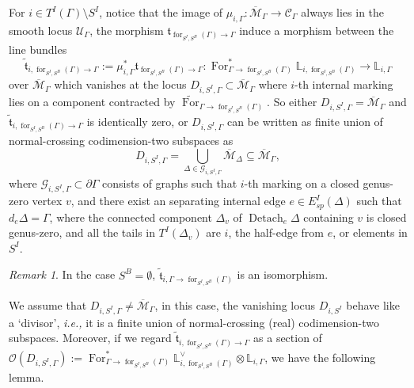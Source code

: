 \documentclass[11pt]{amsart}
\theoremstyle{definition}
\theoremstyle{remark}
\newtheorem{rmk}[dummy]{Remark}
\renewcommand{\for}{\operatorname{for}}
\newcommand{\For}{\operatorname{For}}
\newcommand{\<}{\left<}
\renewcommand{\>}{\right>}
\numberwithin{equation}{section}
\def\Mbar{{\overline{\mathcal M}}}
\begin{document}
For $i\in T^I(\Gamma)\setminus S^I$, notice that the image of $\mu_{i,\Gamma}\colon \Mbar_{\Gamma}\to \mathcal C_\Gamma$ always lies in the smooth locus $\mathcal U_{\Gamma}$, the morphism  $\mathfrak t_{\for_{{S^I,S^B}}(\Gamma)\to \Gamma}$ induce a morphism between the line bundles $$\tilde{\mathfrak t}_{i,\for_{{S^I,S^B}}(\Gamma)\to \Gamma}:=  \mu_{i,\Gamma}^*\mathfrak t_{\for_{{S^I,S^B}}(\Gamma)\to \Gamma}\colon \For_{\Gamma\to \for_{{S^I,S^B}}(\Gamma)}^*\mathbb L_{i,\for_{{S^I,S^B}}(\Gamma)}\to \mathbb L_{i,\Gamma}$$ over $\Mbar_\Gamma$ which vanishes at the locus $D_{i,S^I,\Gamma}\subset \Mbar_\Gamma$ where $i$-th internal marking lies on a component contracted by $\widetilde{\For}_{\Gamma\to \for_{{S^I,S^B}}(\Gamma)}$. So either $D_{i,S^I,\Gamma}= \Mbar_\Gamma$ and $\tilde{\mathfrak t}_{i,\for_{{S^I,S^B}}(\Gamma)\to \Gamma}$ is identically zero, or $D_{i,S^I,\Gamma}$ can be written as finite union of normal-crossing codimension-two subspaces as
$$
D_{i,S^I,\Gamma}=\bigcup_{\Delta \in \mathcal G_{i,S^I,\Gamma}} \Mbar_{\Delta} \subseteq\Mbar_{\Gamma},
$$
where $\mathcal G_{i,S^I,\Gamma}\subset \partial \Gamma$ consists of graphs such that $i$-th marking on a closed genus-zero vertex $v$, and there exist an separating internal edge $e\in E^I_{sp}(\Delta)$ such that $d_e\Delta=\Gamma$, where the connected component $\Delta_v$ of $\operatorname{Detach}_e \Delta$ containing $v$ is closed genus-zero, and  all the tails in $T^I(\Delta_v)$ are $i$, the half-edge from $e$, or elements in $S^I$. 

\begin{rmk}\label{rmk forget boundry point}
In the case $S^B=\emptyset$,  $\tilde{\mathfrak t}_{i,\Gamma \to \for_{{S^I,S^B}}(\Gamma)}$ is an isomorphism.
\end{rmk}
 We assume that $D_{i,S^I,\Gamma}\ne \Mbar_{\Gamma}$, in this case, the vanishing locus $D_{i,S^I}$ behave like a `divisor', \textit{i.e.,} it is a finite union of normal-crossing (real) codimension-two subspaces. Moreover, if we regard $\tilde{\mathfrak t}_{i,\for_{{S^I,S^B}}(\Gamma)\to \Gamma}$ as a section of $\mathcal O(D_{i,S^I,\Gamma}):=\For_{\Gamma \to \for_{{S^I,S^B}}(\Gamma)}^* \mathbb L_{i,\for_{{S^I,S^B}}(\Gamma)}^\vee \otimes \mathbb L_{i,\Gamma}$, we have the following lemma.
 
\end{document}
